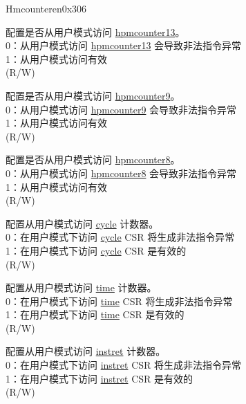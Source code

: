 \begin{register}{H}{mcounteren}{0x306}\label{regdesc:MCOUNTEREN}
%
%
%
%
%
%
%
%
%
\regnewline%
\begin{regdesc}\begin{reglist}
\label{fielddesc:MCOUNTEREN_HPM_13}\item [{HPM13}] 配置是否从用户模式访问 \hyperref[regdesc:HPMCOUNTER13] {hpmcounter13}。\\
0：从用户模式访问 \hyperref[regdesc:HPMCOUNTER13] {hpmcounter13} 会导致非法指令异常\\
1：从用户模式访问有效\\
(R/W)
\label{fielddesc:MCOUNTEREN_HPM9}\item [{HPM9}] 配置是否从用户模式访问 \hyperref[regdesc:HPMCOUNTER9] {hpmcounter9}。\\
0：从用户模式访问 \hyperref[regdesc:HPMCOUNTER9] {hpmcounter9} 会导致非法指令异常\\
1：从用户模式访问有效\\
(R/W)
\label{fielddesc:MCOUNTEREN_HPM_8}\item [{HPM8}] 配置是否从用户模式访问 \hyperref[regdesc:HPMCOUNTER8] {hpmcounter8}。\\
0：从用户模式访问 \hyperref[regdesc:HPMCOUNTER13] {hpmcounter8} 会导致非法指令异常\\
1：从用户模式访问有效\\
(R/W)
\label{fielddesc:MCOUNTEREN_CY}\item [CY] 配置从用户模式访问 \hyperref[regdesc:CYCLE]{cycle} 计数器。 \\
0：在用户模式下访问 \hyperref[regdesc:CYCLE]{cycle} CSR 将生成非法指令异常 \\
1：在用户模式下访问 \hyperref[regdesc:CYCLE]{cycle} CSR 是有效的 \\
(R/W) \\
\label{fielddesc:MCOUNTEREN_TM}\item [TM] 配置从用户模式访问 \hyperref[regdesc:TIME]{time} 计数器。 \\
0：在用户模式下访问 \hyperref[regdesc:TIME]{time} CSR 将生成非法指令异常 \\
1：在用户模式下访问 \hyperref[regdesc:TIME]{time} CSR 是有效的\\
(R/W)  \\
\label{fielddesc:MCOUNTEREN_IR}\item [IR] 配置从用户模式访问 \hyperref[regdesc:INSTRET]{instret} 计数器。 \\
0：在用户模式下访问 \hyperref[regdesc:INSTRET]{instret} CSR 将生成非法指令异常\\
1：在用户模式下访问 \hyperref[regdesc:INSTRET]{instret} CSR 是有效的 \\
(R/W) \\
\end{reglist}\end{regdesc}
\end{register}

